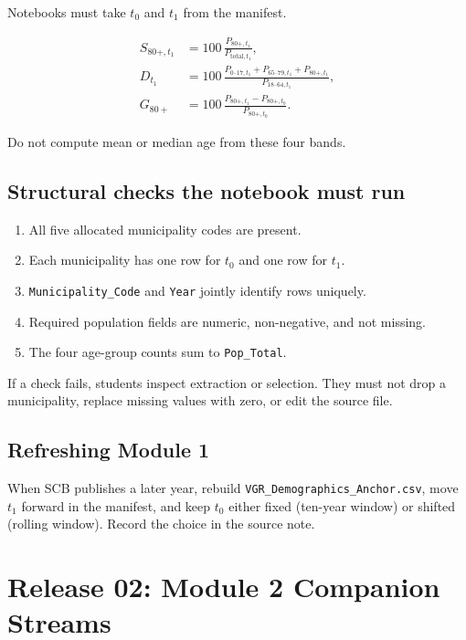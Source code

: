 \documentclass[11pt,a4paper]{article}
\begin{document}
Notebooks must take $t_0$ and $t_1$ from the manifest.

\begin{align*}
S_{80+,t_{1}}
&=
100\,\frac{P_{80+,t_{1}}}{P_{\mathrm{total},t_{1}}},
\\[0.6em]
D_{t_{1}}
&=
100\,\frac{P_{0\text{--}17,t_{1}}+P_{65\text{--}79,t_{1}}+P_{80+,t_{1}}}{P_{18\text{--}64,t_{1}}},
\\[0.6em]
G_{80+}
&=
100\,\frac{P_{80+,t_{1}}-P_{80+,t_{0}}}{P_{80+,t_{0}}}.
\end{align*}

Do not compute mean or median age from these four bands.

\subsection*{Structural checks the notebook must run}

\begin{enumerate}
    \item All five allocated municipality codes are present.
    \item Each municipality has one row for $t_0$ and one row for $t_1$.
    \item \texttt{Municipality\_Code} and \texttt{Year} jointly identify
    rows uniquely.
    \item Required population fields are numeric, non-negative, and not
    missing.
    \item The four age-group counts sum to \texttt{Pop\_Total}.
\end{enumerate}

If a check fails, students inspect extraction or selection. They must
not drop a municipality, replace missing values with zero, or edit the
source file.

\subsection*{Refreshing Module 1}

When SCB publishes a later year, rebuild
\texttt{VGR\_Demographics\_Anchor.csv}, move $t_1$ forward in the
manifest, and keep $t_0$ either fixed (ten-year window) or shifted
(rolling window). Record the choice in the source note.

\section{Release 02: Module 2 Companion Streams}
\end{document}
